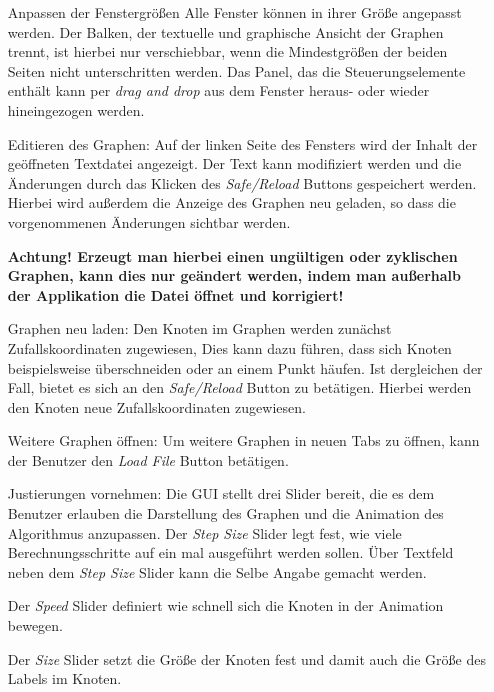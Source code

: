 \begin{enumerate}
    \item[Anpassen der Fenstergrößen] Alle Fenster können in ihrer Größe angepasst werden. Der Balken, der textuelle und graphische Ansicht der Graphen trennt, ist hierbei nur verschiebbar, wenn die Mindestgrößen der beiden Seiten nicht unterschritten werden.
   Das Panel, das die Steuerungselemente enthält kann per \textit{drag and drop} aus dem Fenster heraus- oder wieder hineingezogen werden.
    
    \item[Editieren des Graphen:] Auf der linken Seite des Fensters wird der Inhalt der geöffneten Textdatei angezeigt. Der Text kann modifiziert werden und die Änderungen durch das Klicken des \textit{Safe/Reload} Buttons gespeichert werden. Hierbei wird außerdem die Anzeige des Graphen neu geladen, so dass die vorgenommenen Änderungen sichtbar werden. 
    
    \textbf{Achtung! Erzeugt man hierbei einen ungültigen oder zyklischen Graphen, kann dies nur geändert werden, indem man außerhalb der Applikation die Datei öffnet und korrigiert!}
    
    \item[Graphen neu laden:] Den Knoten im Graphen werden zunächst Zufallskoordinaten zugewiesen, Dies kann dazu führen, dass sich Knoten beispielsweise überschneiden oder an einem Punkt häufen. Ist dergleichen der Fall, bietet es sich an den \textit{Safe/Reload} Button zu betätigen. Hierbei werden den Knoten neue Zufallskoordinaten zugewiesen.
    
    \item[Weitere Graphen öffnen:] Um weitere Graphen in neuen Tabs zu öffnen, kann der Benutzer den \textit{Load File} Button betätigen.
    
    \item[Justierungen vornehmen:] Die GUI stellt drei Slider bereit, die es dem Benutzer erlauben die Darstellung des Graphen und die Animation des Algorithmus anzupassen. Der \textit{Step Size} Slider legt fest, wie viele Berechnungsschritte auf ein mal ausgeführt werden sollen. Über Textfeld neben dem \textit{Step Size} Slider kann die Selbe Angabe gemacht werden. 
    
    Der \textit{Speed} Slider definiert wie schnell sich die Knoten in der Animation bewegen.
    
    Der \textit{Size} Slider setzt die Größe der Knoten fest und damit auch die Größe des Labels im Knoten.
    

\end{enumerate}

